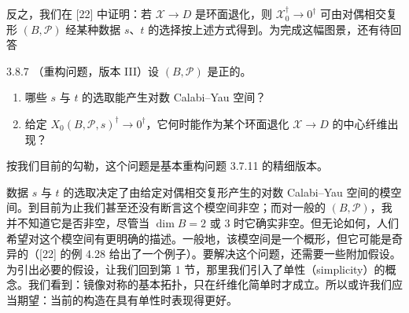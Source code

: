 反之，我们在 [22] 中证明：若 $\mathcal X\to D$ 是环面退化，则 $\mathcal X_0^\dagger\to0^\dagger$ 可由对偶相交复形 $(B,\mathcal P)$ 经某种数据 $s$、$t$ 的选择按上述方式得到。为完成这幅图景，还有待回答

\begin{question}{3.8.7}
（重构问题，版本 III）设 $(B,\mathcal P)$ 是正的。
\begin{enumerate}[label=(\arabic*)]
\item 哪些 $s$ 与 $t$ 的选取能产生对数 Calabi--Yau 空间？
\item 给定 $X_0(B,\mathcal P,s)^\dagger\to0^\dagger$，它何时能作为某个环面退化 $\mathcal X\to D$ 的中心纤维出现？
\end{enumerate}
\end{question}

按我们目前的勾勒，这个问题是基本重构问题 3.7.11 的精细版本。

数据 $s$ 与 $t$ 的选取决定了由给定对偶相交复形产生的对数 Calabi--Yau 空间的模空间。到目前为止我们甚至还没有断言这个模空间非空；而对一般的 $(B,\mathcal P)$，我并不知道它是否非空，尽管当 $\dim B=2$ 或 $3$ 时它确实非空。但无论如何，人们希望对这个模空间有更明确的描述。一般地，该模空间是一个概形，但它可能是奇异的（[22] 的例 4.28 给出了一个例子）。要解决这个问题，还需要一些附加假设。为引出必要的假设，让我们回到第 1 节，那里我们引入了单性（simplicity）的概念。我们看到：镜像对称的基本拓扑，只在纤维化简单时才成立。所以或许我们应当期望：当前的构造在具有单性时表现得更好。
